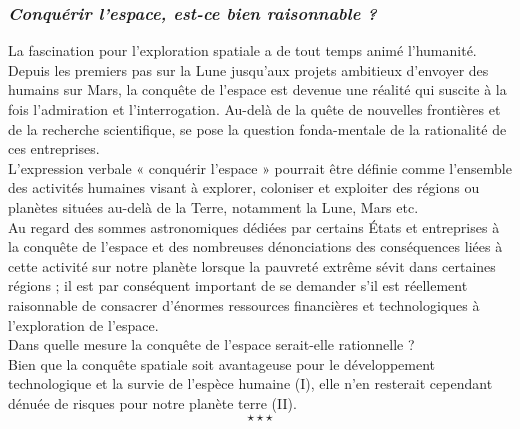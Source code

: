 \newpage\begin{center}
	\subsubsection*{\textit{Conquérir l'espace, est-ce bien raisonnable ?}}
\end{center}
\hspace*{0.5cm}La fascination pour l’exploration spatiale a de tout temps animé l’humanité. Depuis les premiers pas sur la Lune jusqu'aux projets ambitieux d'envoyer des humains sur Mars, la conquête de l'espace est devenue une réalité qui suscite à la fois l'admiration et l'interrogation. Au-delà de la quête de nouvelles frontières et de la recherche scientifique, se pose la question fonda-mentale de la rationalité de ces entreprises. \\
\hspace*{0.5cm}L’expression verbale « conquérir l'espace » pourrait être définie comme l'ensemble des activités humaines visant à explorer, coloniser et exploiter des régions ou planètes situées au-delà de la Terre, notamment la Lune, Mars etc.\\
\hspace*{0.5cm}Au regard des sommes astronomiques dédiées par certains États et entreprises à la conquête de l’espace et des nombreuses dénonciations des conséquences liées à cette activité sur notre planète lorsque la pauvreté extrême sévit dans certaines régions ; il est par conséquent important de se demander s’il est réellement raisonnable de consacrer d'énormes ressources financières et technologiques à l'exploration de l'espace.\\
\hspace*{0.5cm}Dans quelle mesure la conquête de l’espace serait-elle rationnelle ?\\
\hspace*{0.5cm}Bien que la conquête spatiale soit avantageuse pour le développement technologique et la survie de l’espèce humaine (I), elle n’en resterait cependant dénuée de risques pour notre planète terre (II).
$$\star \star \star$$
